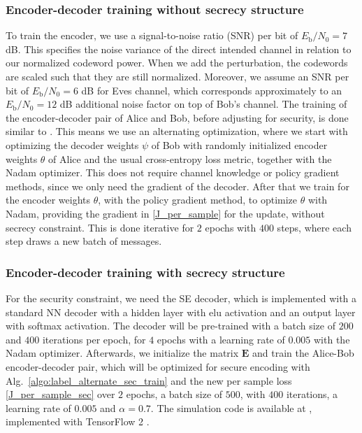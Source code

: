 \documentclass[conference, 10pt]{IEEEtran}
\begin{document}
\subsubsection{Encoder-decoder training without secrecy structure}
To train the encoder, we use a signal-to-noise ratio (SNR) per bit of $E_{\text{b}}/N_0=7$ dB. This specifies the noise variance of the direct intended channel in relation to our normalized codeword power. When we add the perturbation, the codewords are scaled such that they are still normalized. Moreover, we assume an SNR per bit of $E_{\text{b}}/N_0 = 6$ dB for Eves channel, which corresponds approximately to an $E_{\text{b}}/N_0=12$ dB additional noise factor on top of Bob's channel. The training of the encoder-decoder pair of Alice and Bob, before adjusting for security, is done similar to \cite{Aoudia-RL}. This means we use an alternating optimization, where we start with optimizing the decoder weights $\psi$ of Bob with randomly initialized encoder weights $\theta$ of Alice and the usual cross-entropy loss metric, together with the Nadam optimizer. This does not require channel knowledge or policy gradient methods, since we only need the gradient of the decoder. After that we train for the encoder weights $\theta$, with the policy gradient method, to optimize $\theta$ with Nadam, providing the gradient in \eqref{J_per_sample} for the update, without secrecy constraint. This is done iterative for $2$ epochs with $400$ steps, where each step draws a new batch of messages.
\subsubsection{Encoder-decoder training with secrecy structure}
For the security constraint, we need the SE decoder, which is implemented with a standard NN decoder with a hidden layer with elu activation and an output layer with softmax activation. The decoder will be pre-trained with a batch size of $200$ and $400$ iterations per epoch, for $4$ epochs with a learning rate of $0.005$ with the Nadam optimizer. Afterwards, we initialize the matrix $\mathbf{E}$ and train the Alice-Bob encoder-decoder pair, which will be optimized for secure encoding with Alg.~\ref{algo:label_alternate_sec_train} and the new per sample loss \eqref{J_per_sample_sec} over $2$ epochs, a batch size of $500$, with $400$ iterations, a learning rate of $0.005$ and $\alpha = 0.7$. The simulation code is available at \cite{Fritschek2020_code}, implemented with TensorFlow 2 \cite{tensorflow2015-whitepaper}.
\end{document}
